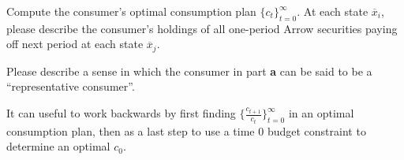\medskip
{}  Compute the consumer's optimal consumption plan $\{c_t\}_{t=0}^\infty$. At each state $\overline x_i$, please describe the consumer's
holdings of all one-period Arrow securities paying off next period
at each state   $\overline x_j$.

\medskip
{}   Please describe a sense in which the consumer in part {\bf a}  can be said to be a ``representative consumer''.


\medskip

 It can useful to work backwards by first finding $\{{\frac{c_{t+1}}{c_t}}\}_{t=0}^\infty$ in an optimal consumption plan,
then as a last step to use a time $0$ budget constraint to determine an optimal $c_0$.





